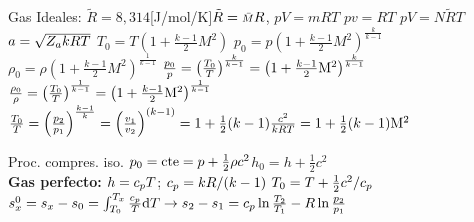\begin{formuleo}
Gas Ideales: $\tilde{R}=8,314 $[J/mol/K]\separar $\tilde{R}={\scriptstyle \bar{M}} R$, \molarmass [kg/mol]\separar $pV = m R T$ \separar $pv= RT$ \separar $pV = N\tilde{R}T$ \separar $a = \sqrt{Z_a k RT}$ \separar $T_{0}=T\left(1+\frac{k-1}{2} M^{2}\right)$ \separar $p_{0}=p\left(1+\frac{k-1}{2} M^{2}\right)^{\frac{k}{k-1}}$  \separar $\rho_{0}=\rho\left(1+\frac{k-1}{2} M^{2}\right)^{\frac{1}{k-1}}$ \separar $    \frac{p_0}{p}=\left(\frac{T_0}{T} \right)^{\frac{k}{k-1}} =\left(1+ \frac{k-1}{2}\mathrm{M}^2 \right)^{\frac{k}{k-1}}$ \separar $    \frac{\rho_0}{\rho}=\left(\frac{T_0}{T} \right)^{\frac{1}{k-1}} =\left(1+ \frac{k-1}{2}\mathrm{M}^2 \right)^{\frac{1}{k-1}}$ \separar $\frac{T_0}{T}
=\left(\frac{p_{2}}{p_{1}}\right)^{\frac{k-1}{k}}=\left(\frac{v_{1}}{v_{2}}\right)^{(k-1)}
=1+\tfrac{1}{2}(k-1)\frac{c^2}{kR T}=1+\tfrac{1}{2}(k-1)\mathrm{M}^2$\separar 

Proc. compres. iso. $p_0=\textrm{cte}=p+\frac{1}{2}\rho c^2$\separar $h_0=h+\frac{1}{2}c^2$ \\
\textbf{Gas perfecto:} $h=c_p T$;  $c_p = k R/(k -1)$ \going $T_0=T+\frac{1}{2}c^2/c_p $ \separar $s_{x}^{0}=s_{x}-s_{0}=\int_{T_{0}}^{T_{x}} \frac{c_{p}}{T} \mathrm{d} T \rightarrow s_{2}-s_{1}=c_{p} \ln \frac{T_{2}}{T_{1}}-R \ln \frac{p_{2}}{p_{1}}$


\end{formuleo}
\vspace{\formuleoseparator} 